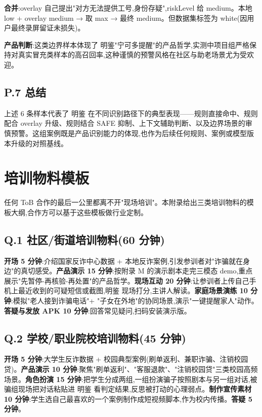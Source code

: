 \documentclass[UTF8,a4paper,12pt]{ctexart}
\begin{document}
\textbf{合并}:overlay 自己提出"对方无法提供工号,身份存疑",riskLevel 给 medium。本地 low + overlay medium → 取 max → 最终 medium。但数据集标签为 white(因用户最终录屏留证未损失)。

\textbf{产品判断}:这类边界样本体现了 明鉴"宁可多提醒"的产品哲学,实测中项目组严格保持对真实冒充类样本的高召回率,这种谨慎的预警风格在社区与助老场景尤为受欢迎。

\subsection*{P.7 总结}

上述 6 条样本代表了 明鉴 在不同识别路径下的典型表现——规则直接命中、规则配合 overlay 升级、规则结合 SAFE 抑制、上下文辅助判断、以及边界场景的审慎预警。这组案例既是产品识别能力的体现,也作为后续任何规则、案例或模型版本升级的对照基线。

\section{培训物料模板}

任何 ToB 合作的最后一公里都离不开"现场培训"。本附录给出三类培训物料的模板大纲,合作方可以基于这些模板做行业定制。

\subsection*{Q.1 社区/街道培训物料(60 分钟)}

\textbf{开场 5 分钟}:介绍国家反诈中心数据 + 本地反诈案例,引发参训者对"诈骗就在身边"的真切感受。\textbf{产品演示 15 分钟}:按附录 M 的演示剧本走完三模态 demo,重点展示"先暂停-再核验-再处置"的产品哲学。\textbf{现场互动 20 分钟}:让参训者上传自己手机上最近收到的可疑短信或截图,明鉴 现场打分,主讲人解读。\textbf{家庭场景演练 10 分钟}:模拟"老人接到诈骗电话"+ "子女在外地"的协同场景,演示"一键提醒家人"动作。\textbf{答疑与发放 APK 10 分钟}:回答常见疑问,扫码安装演示版。

\subsection*{Q.2 学校/职业院校培训物料(45 分钟)}

\textbf{开场 5 分钟}:大学生反诈数据 + 校园典型案例(刷单返利、兼职诈骗、注销校园贷)。\textbf{产品演示 10 分钟}:聚焦"刷单返利"、"客服退款"、"注销校园贷"三类校园高频场景。\textbf{角色扮演 15 分钟}:把学生分成两组,一组扮演骗子按照剧本与另一组对话,被骗组现场把对话粘贴进 明鉴 看判定结果,反思被打动的心理弱点。\textbf{制作宣传素材 10 分钟}:学生选自己最喜欢的一个案例制作成短视频脚本,作为校内传播。\textbf{答疑 5 分钟}。
\end{document}
